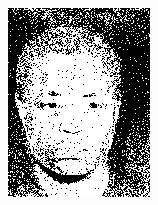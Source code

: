 \begin{figure}[h]
\begin{subfigure}[b]{0.18\textwidth}
         \includegraphics[width=\textwidth]{images/results/base_st/dd110.color.d3_bayes.png}
     \end{subfigure}
     \hfill
     \begin{subfigure}[b]{0.18\textwidth}
         \centering

\end{subfigure}
\end{figure}
